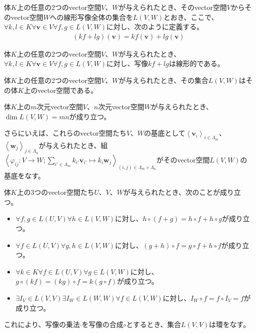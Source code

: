 \documentclass[dvipdfmx]{jsarticle}
\begin{document}
\begin{dfn*}
体$K$上の任意の2つのvector空間$V$、$W$が与えられたとき、そのvector空間$V$からそのvector空間$W$への線形写像全体の集合を$L(V,W)$とおき、ここで、$\forall k,l \in K\forall\mathbf{v} \in V\forall f,g \in L(V,W)$に対し、次のように定義する。
\begin{align*}
(kf + lg)\left( \mathbf{v} \right) = kf\left( \mathbf{v} \right) + lg\left( \mathbf{v} \right)
\end{align*}
\end{dfn*}
\begin{thm*}
体$K$上の任意の2つのvector空間$V$、$W$が与えられたとき、$\forall k,l \in K\forall\mathbf{v} \in V\forall f,g \in L(V,W)$に対し、写像$kf + lg$は線形的である。
\end{thm*}
\begin{thm*}
体$K$上の任意の2つのvector空間$V$、$W$が与えられたとき、その集合$L(V,W)$はその体$K$上のvector空間である。
\end{thm*}
\begin{thm*}
体$K$上の$m$次元vector空間$V$、$n$次元vector空間$W$が与えられたとき、$\dim{L(V,W)} = mn$が成り立つ。\par
さらにいえば、これらのvector空間たち$V$、$W$の基底として$\left\langle \mathbf{v}_{i} \right\rangle_{i \in \varLambda_{m}}$、$\left\langle \mathbf{w}_{j} \right\rangle_{j \in \varLambda_{n}}$が与えられたとき、組$\left\langle \varphi_{ij}:V \rightarrow W;\sum_{i' \in \varLambda_{m}} {k_{i'}\mathbf{v}_{i'}} \mapsto k_{i}\mathbf{w}_{j} \right\rangle_{(i,j) \in \varLambda_{m} \times \varLambda_{n}}$がそのvector空間$L(V,W)$の基底をなす。
\end{thm*}
\begin{thm*}
体$K$上の3つのvector空間たち$U$、$V$、$W$が与えられたとき、次のことが成り立つ。
\begin{itemize}
\item
  $\forall f,g \in L(U,V)\forall h \in L(V,W)$に対し、$h \circ (f + g) = h \circ f + h \circ g$が成り立つ。
\item
  $\forall f \in L(U,V)\forall g,h \in L(V,W)$に対し、$(g + h) \circ f = g \circ f + h \circ f$が成り立つ。
\item
  $\forall k \in K\forall f \in L(U,V)\forall g \in L(V,W)$に対し、$g \circ (kf) = (kg) \circ f = k(g \circ f)$が成り立つ。
\item
  $\exists I_{V} \in L(V,V)\exists I_{W} \in L(W,W)\forall f \in L(V,W)$に対し、$I_{W} \circ f = f \circ I_{V} = f$が成り立つ。
\end{itemize}
これにより、写像の乗法$\cdot$を写像の合成$\circ$とするとき、集合$L(V,V)$は環をなす。
\end{thm*}
\end{document}
